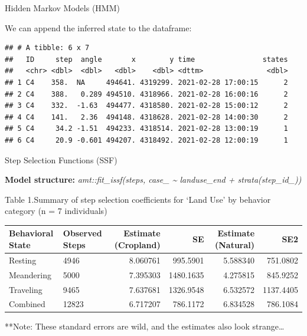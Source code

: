 \documentclass[
  ignorenonframetext,
]{beamer}
\begin{document}
\begin{frame}[fragile]{Hidden Markov Models (HMM)}
\protect\hypertarget{hidden-markov-models-hmm-4}{}

We can append the inferred state to the dataframe:

\begin{verbatim}
## # A tibble: 6 x 7
##   ID     step  angle       x        y time                states
##   <chr> <dbl>  <dbl>   <dbl>    <dbl> <dttm>               <dbl>
## 1 C4    358.  NA     494641. 4319299. 2021-02-28 17:00:15      2
## 2 C4    388.   0.289 494510. 4318966. 2021-02-28 16:00:16      2
## 3 C4    332.  -1.63  494477. 4318580. 2021-02-28 15:00:12      2
## 4 C4    141.   2.36  494148. 4318628. 2021-02-28 14:00:30      2
## 5 C4     34.2 -1.51  494233. 4318514. 2021-02-28 13:00:19      1
## 6 C4     20.9 -0.601 494207. 4318492. 2021-02-28 12:00:19      1
\end{verbatim}

\end{frame}

\begin{frame}{Step Selection Functions (SSF)}
\protect\hypertarget{step-selection-functions-ssf-1}{}

\textbf{Model structure:} \emph{amt::fit\_issf(steps, case\_
\textasciitilde{} landuse\_end + strata(step\_id\_))}

Table 1.Summary of step selection coefficients for `Land Use' by
behavior category (n = 7 individuals)

\begin{table}
\centering
\begin{tabular}{l|l|r|r|r|r}
\hline
\begingroup\fontsize{20}{22}\selectfont Behavioral State\endgroup & \begingroup\fontsize{20}{22}\selectfont Observed Steps\endgroup & \begingroup\fontsize{20}{22}\selectfont Estimate (Cropland)\endgroup & \begingroup\fontsize{20}{22}\selectfont SE\endgroup & \begingroup\fontsize{20}{22}\selectfont Estimate (Natural)\endgroup & \begingroup\fontsize{20}{22}\selectfont SE2\endgroup\\
\hline
Resting & 4946 & 8.060761 & 995.5901 & 5.588340 & 751.0802\\
\hline
Meandering & 5000 & 7.395303 & 1480.1635 & 4.275815 & 845.9252\\
\hline
Traveling & 9465 & 7.637681 & 1326.9548 & 6.532572 & 1137.4405\\
\hline
Combined & 12823 & 6.717207 & 786.1172 & 6.834528 & 786.1084\\
\hline
\end{tabular}
\end{table}

**Note: These standard errors are wild, and the estimates also look
strange\ldots{}

\end{frame}
\end{document}
